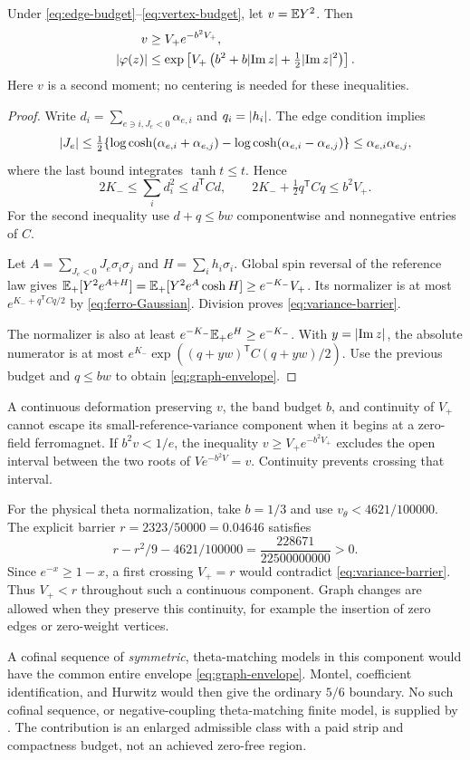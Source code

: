 \begin{proposition}\label{prop:reference-variance}
Under \eqref{eq:edge-budget}--\eqref{eq:vertex-budget}, let $v=\mathbb E Y^2$. Then
\begin{align}
 v&\ge V_+e^{-b^2V_+},\label{eq:variance-barrier}\\
 \lvert\varphi(z)\rvert&\le
 \exp\left[V_+\left(b^2+b\lvert\operatorname{Im} z\rvert+\tfrac12\lvert\operatorname{Im} z\rvert^2\right)\right].
 \label{eq:graph-envelope}
\end{align}
Here $v$ is a second moment; no centering is needed for these inequalities.
\end{proposition}
\begin{proof}
Write $d_i=\sum_{e\ni i,J_e<0}\alpha_{e,i}$ and $q_i=\lvert h_i\rvert$. The edge condition implies
\[
 \lvert J_e\rvert\le\tfrac12\{
 \log\cosh(\alpha_{e,i}+\alpha_{e,j})
 -\log\cosh(\alpha_{e,i}-\alpha_{e,j})\}
 \le\alpha_{e,i}\alpha_{e,j},
\]
where the last bound integrates $\tanh t\le t$. Hence
\[
 2K_-\le\sum_i d_i^2\le d^{\mathsf T}Cd,
 \qquad 2K_-+\tfrac12q^{\mathsf T}Cq\le b^2V_+.
\]
For the second inequality use $d+q\le bw$ componentwise and nonnegative entries of $C$.

Let $A=\sum_{J_e<0}J_e\sigma_i\sigma_j$ and $H=\sum_i h_i\sigma_i$. Global spin reversal of the reference law gives
$\mathbb E_+[Y^2e^{A+H}]=\mathbb E_+[Y^2e^A\cosh H]\ge e^{-K_-}V_+$. Its normalizer is at most $e^{K_-+q^{\mathsf T}Cq/2}$ by \eqref{eq:ferro-Gaussian}. Division proves \eqref{eq:variance-barrier}.

The normalizer is also at least $e^{-K_-}\mathbb E_+e^H\ge e^{-K_-}$. With $y=\lvert\operatorname{Im} z\rvert$, the absolute numerator is at most
$e^{K_-}\exp((q+yw)^{\mathsf T}C(q+yw)/2)$. Use the previous budget and $q\le bw$ to obtain \eqref{eq:graph-envelope}.
\end{proof}

A continuous deformation preserving $v$, the band budget $b$, and continuity of $V_+$ cannot escape its small-reference-variance component when it begins at a zero-field ferromagnet. If $b^2v<1/e$, the inequality $v\ge V_+e^{-b^2V_+}$ excludes the open interval between the two roots of $Ve^{-b^2V}=v$. Continuity prevents crossing that interval.

For the physical theta normalization, take $b=1/3$ and use $v_\theta<4621/100000$. The explicit barrier $r=2323/50000=0.04646$ satisfies
\[
 r-r^2/9-4621/100000=\frac{228671}{22500000000}>0.
\]
Since $e^{-x}\ge1-x$, a first crossing $V_+=r$ would contradict \eqref{eq:variance-barrier}. Thus $V_+<r$ throughout such a continuous component. Graph changes are allowed when they preserve this continuity, for example the insertion of zero edges or zero-weight vertices.

A cofinal sequence of \emph{symmetric}, theta-matching models in this component would have the common entire envelope \eqref{eq:graph-envelope}. Montel, coefficient identification, and Hurwitz would then give the ordinary $5/6$ boundary. No such cofinal sequence, or negative-coupling theta-matching finite model, is supplied by \cite{R1003}. The contribution is an enlarged admissible class with a paid strip and compactness budget, not an achieved zero-free region.
